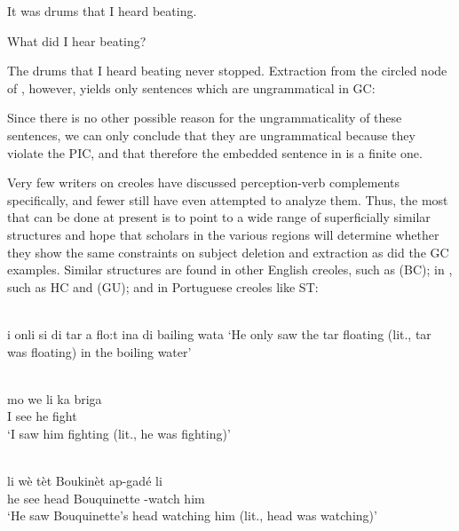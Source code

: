 \ea\label{ex:2:143}
 It was drums that I heard beating.
\z

\ea\label{ex:2:144}
 What did I hear beating?
\z

\ea\label{ex:2:145}
 The drums that I heard beating never stopped.
\z
Extraction from the circled node of , however, yields only sentences which are ungrammatical in GC:

\z

\z

\z
Since there is no other possible reason for the ungrammaticality of these sentences, we can only conclude that they are ungrammatical because they violate the PIC, and that therefore the embedded sentence in  is a finite one.


Very few writers on creoles have discussed perception-verb com\-plements specifically, and fewer still have even attempted to analyze them. Thus, the most that can be done at present is to point to a wide range of superficially similar structures and hope that scholars in the various regions will determine whether they show the same constraints on subject deletion and extraction as did the GC examples. Similar structures are found in other English creoles, such as  (BC); in , such as HC and  (GU); and in Portuguese creoles like ST:

\ea\label{ex:2:149}
\langinfo{\langBC}{}{}\\
i onli si di tar a flo:t ina di bailing wata
\glt `He only saw the tar floating (lit., tar was floating) in the boiling water'
\z

\ea\label{ex:2:150}
\langinfo{\langGU}{}{}\\
 \gll mo we li ka briga\\
I see he {\ASP} fight\\
\glt `I saw him fighting (lit., he was fighting)'
\z

\ea\label{ex:2:151}
\langinfo{\langHC}{}{}\\
\gll li wè tèt Boukinèt ap-gadé li\\
he see head Bouquinette \ASP-watch him \\
\glt `He saw Bouquinette's head watching him (lit., head was watching)'
\z

